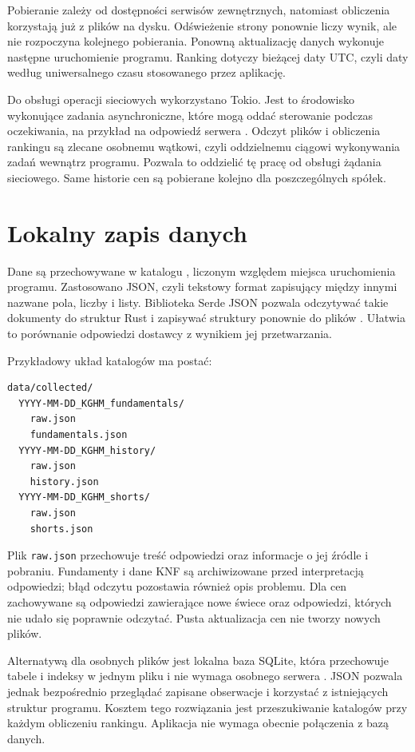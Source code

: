\documentclass[12pt,a4paper,twoside]{report}
\begin{document}
Pobieranie zależy od dostępności serwisów zewnętrznych, natomiast obliczenia korzystają już z plików na dysku. Odświeżenie strony ponownie liczy wynik, ale nie rozpoczyna kolejnego pobierania. Ponowną aktualizację danych wykonuje następne uruchomienie programu. Ranking dotyczy bieżącej daty UTC, czyli daty według uniwersalnego czasu stosowanego przez aplikację.

Do obsługi operacji sieciowych wykorzystano Tokio. Jest to środowisko wykonujące zadania asynchroniczne, które mogą oddać sterowanie podczas oczekiwania, na przykład na odpowiedź serwera \cite{tokio}. Odczyt plików i obliczenia rankingu są zlecane osobnemu wątkowi, czyli oddzielnemu ciągowi wykonywania zadań wewnątrz programu. Pozwala to oddzielić tę pracę od obsługi żądania sieciowego. Same historie cen są pobierane kolejno dla poszczególnych spółek.

\section{Lokalny zapis danych}

Dane są przechowywane w katalogu , liczonym względem miejsca uruchomienia programu. Zastosowano JSON, czyli tekstowy format zapisujący między innymi nazwane pola, liczby i listy. Biblioteka Serde JSON pozwala odczytywać takie dokumenty do struktur Rust i zapisywać struktury ponownie do plików \cite{serdejson}. Ułatwia to porównanie odpowiedzi dostawcy z wynikiem jej przetwarzania.

Przykładowy układ katalogów ma postać:
\begin{verbatim}
data/collected/
  YYYY-MM-DD_KGHM_fundamentals/
    raw.json
    fundamentals.json
  YYYY-MM-DD_KGHM_history/
    raw.json
    history.json
  YYYY-MM-DD_KGHM_shorts/
    raw.json
    shorts.json
\end{verbatim}

Plik \texttt{raw.json} przechowuje treść odpowiedzi oraz informacje o jej źródle i pobraniu. Fundamenty i dane KNF są archiwizowane przed interpretacją odpowiedzi; błąd odczytu pozostawia również opis problemu. Dla cen zachowywane są odpowiedzi zawierające nowe świece oraz odpowiedzi, których nie udało się poprawnie odczytać. Pusta aktualizacja cen nie tworzy nowych plików.

Alternatywą dla osobnych plików jest lokalna baza SQLite, która przechowuje tabele i indeksy w jednym pliku i nie wymaga osobnego serwera \cite{sqlite}. JSON pozwala jednak bezpośrednio przeglądać zapisane obserwacje i korzystać z istniejących struktur programu. Kosztem tego rozwiązania jest przeszukiwanie katalogów przy każdym obliczeniu rankingu. Aplikacja nie wymaga obecnie połączenia z bazą danych.
\end{document}
